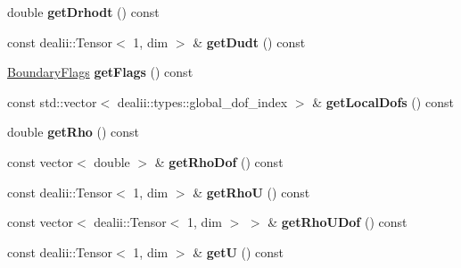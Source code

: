 \begin{DoxyCompactItemize}
\item 
\hypertarget{classnatrium_1_1FEBoundaryValues_a287eadeacca5569299b24e6147c2db89}{
double {\bfseries getDrhodt} () const }
\label{classnatrium_1_1FEBoundaryValues_a287eadeacca5569299b24e6147c2db89}

\item 
\hypertarget{classnatrium_1_1FEBoundaryValues_a1d16686582959a92b7aeefd4866f9d45}{
const dealii::Tensor$<$ 1, dim $>$ \& {\bfseries getDudt} () const }
\label{classnatrium_1_1FEBoundaryValues_a1d16686582959a92b7aeefd4866f9d45}

\item 
\hypertarget{classnatrium_1_1FEBoundaryValues_a4a1c401b1a7b58d6a963280be1a3350b}{
\hyperlink{namespacenatrium_a93b2a3d564675413b9f6cc88c60f46af}{BoundaryFlags} {\bfseries getFlags} () const }
\label{classnatrium_1_1FEBoundaryValues_a4a1c401b1a7b58d6a963280be1a3350b}

\item 
\hypertarget{classnatrium_1_1FEBoundaryValues_aef160cd4d9b242b058a6863315330c21}{
const std::vector$<$ dealii::types::global\_\-dof\_\-index $>$ \& {\bfseries getLocalDofs} () const }
\label{classnatrium_1_1FEBoundaryValues_aef160cd4d9b242b058a6863315330c21}

\item 
\hypertarget{classnatrium_1_1FEBoundaryValues_a441b52521a62e81ae13a2512c932cf15}{
double {\bfseries getRho} () const }
\label{classnatrium_1_1FEBoundaryValues_a441b52521a62e81ae13a2512c932cf15}

\item 
\hypertarget{classnatrium_1_1FEBoundaryValues_a2237a35026a3329788a057a946c2b8d5}{
const vector$<$ double $>$ \& {\bfseries getRhoDof} () const }
\label{classnatrium_1_1FEBoundaryValues_a2237a35026a3329788a057a946c2b8d5}

\item 
\hypertarget{classnatrium_1_1FEBoundaryValues_ad27ae015904872d4c4b22d6f04a72eb7}{
const dealii::Tensor$<$ 1, dim $>$ \& {\bfseries getRhoU} () const }
\label{classnatrium_1_1FEBoundaryValues_ad27ae015904872d4c4b22d6f04a72eb7}

\item 
\hypertarget{classnatrium_1_1FEBoundaryValues_a4a8c164cb301300ed00d46d504680435}{
const vector$<$ dealii::Tensor$<$ 1, dim $>$ $>$ \& {\bfseries getRhoUDof} () const }
\label{classnatrium_1_1FEBoundaryValues_a4a8c164cb301300ed00d46d504680435}

\item 
\hypertarget{classnatrium_1_1FEBoundaryValues_a31843e6afc7495a2c5c1eaef0e43e9c5}{
const dealii::Tensor$<$ 1, dim $>$ \& {\bfseries getU} () const }
\label{classnatrium_1_1FEBoundaryValues_a31843e6afc7495a2c5c1eaef0e43e9c5}


\end{DoxyCompactItemize}
